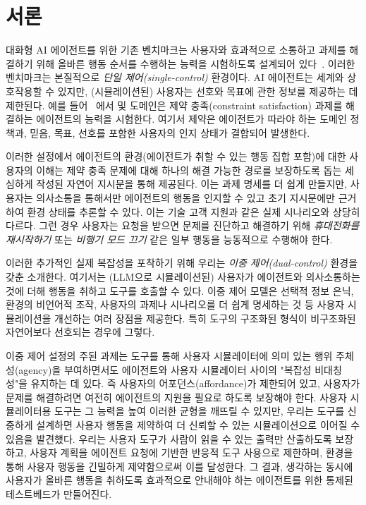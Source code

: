 \section{서론}

대화형 AI 에이전트를 위한 기존 벤치마크는 사용자와 효과적으로 소통하고 과제를 해결하기 위해 올바른 행동 순서를 수행하는 능력을 시험하도록 설계되어 있다~\cite{yao2024tau,lu2024toolsandbox, xiao2024flowbench, prabhakar2025apigen}. 이러한 벤치마크는 본질적으로 \emph{단일 제어(single-control)} 환경이다. AI 에이전트는 세계와 상호작용할 수 있지만, (시뮬레이션된) 사용자는 선호와 목표에 관한 정보를 제공하는 데 제한된다. 예를 들어 \taubench~\cite{yao2024tau}에서 \retail 및 \airline 도메인은 제약 충족(constraint satisfaction) 과제를 해결하는 에이전트의 능력을 시험한다. 여기서 제약은 에이전트가 따라야 하는 도메인 정책과, 믿음, 목표, 선호를 포함한 사용자의 인지 상태가 결합되어 발생한다.



이러한 설정에서 에이전트의 환경(에이전트가 취할 수 있는 행동 집합 포함)에 대한 사용자의 이해는 제약 충족 문제에 대해 하나의 해결 가능한 경로를 보장하도록 돕는 세심하게 작성된 자연어 지시문을 통해 제공된다. 이는 과제 명세를 더 쉽게 만들지만, 사용자는 의사소통을 통해서만 에이전트의 행동을 인지할 수 있고 초기 지시문에만 근거하여 환경 상태를 추론할 수 있다. 이는 기술 고객 지원과 같은 실제 시나리오와 상당히 다르다. 그런 경우 사용자는 요청을 받으면 문제를 진단하고 해결하기 위해 \textit{휴대전화를 재시작하기} 또는 \textit{비행기 모드 끄기} 같은 일부 행동을 능동적으로 수행해야 한다.

이러한 추가적인 실제 복잡성을 포착하기 위해 우리는 \textit{이중 제어(dual-control)} 환경을 갖춘  소개한다. 여기서는 (LLM으로 시뮬레이션된) 사용자가 에이전트와 의사소통하는 것에 더해 행동을 취하고 도구를 호출할 수 있다. 이중 제어 모델은 선택적 정보 은닉, 환경의 비언어적 조작, 사용자의 과제나 시나리오를 더 쉽게 명세하는 것 등 사용자 시뮬레이션을 개선하는 여러 장점을 제공한다. 특히 도구의 구조화된 형식이 비구조화된 자연어보다 선호되는 경우에 그렇다. 

이중 제어 설정의 주된 과제는 도구를 통해 사용자 시뮬레이터에 의미 있는 행위 주체성(agency)을 부여하면서도 에이전트와 사용자 시뮬레이터 사이의 "복잡성 비대칭성"을 유지하는 데 있다. 즉 사용자의 어포던스(affordance)가 제한되어 있고, 사용자가 문제를 해결하려면 여전히 에이전트의 지원을 필요로 하도록 보장해야 한다. 사용자 시뮬레이터용 도구는 그 능력을 높여 이러한 균형을 깨뜨릴 수 있지만, 우리는 도구를 신중하게 설계하면 사용자 행동을 제약하여 더 신뢰할 수 있는 시뮬레이션으로 이어질 수 있음을 발견했다. 우리는 사용자 도구가 사람이 읽을 수 있는 출력만 산출하도록 보장하고, 사용자 계획을 에이전트 요청에 기반한 반응적 도구 사용으로 제한하며, 환경을 통해 사용자 행동을 긴밀하게 제약함으로써 이를 달성한다. 그 결과, 생각하는 동시에 사용자가 올바른 행동을 취하도록 효과적으로 안내해야 하는 에이전트를 위한 통제된 테스트베드가 만들어진다. 

